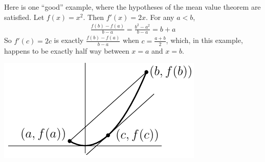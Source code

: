 \begin{eg}\label{eg:mvtf}
Here is one ``good'' example, where the hypotheses of the mean value theorem
are satisfied. Let $f(x)=x^2$. Then $f'(x)=2x$. For any $a<b$,
\begin{align*}
\frac{f(b)-f(a)}{b-a}=\frac{b^2-a^2}{b-a}=b+a
\end{align*}
So $f'(c)=2c$ is exactly $\frac{f(b)-f(a)}{b-a}$ when $c=\frac{a+b}{2}$,
which, in this example, happens to be exactly half way between $x=a$ and
$x=b$.
    \begin{efig}
    \begin{center}
       \includegraphics{mvtf}
    \end{center}
    \end{efig}
\end{eg}

